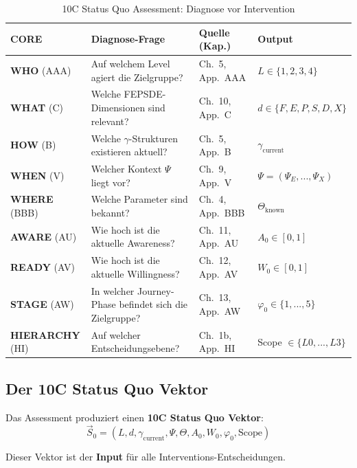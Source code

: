 \begin{table}[htbp]
\centering
\caption{10C Status Quo Assessment: Diagnose vor Intervention}
\label{tab:17-9c-status-quo}
\renewcommand{\arraystretch}{1.4}
\footnotesize
\begin{tabular}{@{}llll@{}}
\toprule
\textbf{CORE} & \textbf{Diagnose-Frage} & \textbf{Quelle (Kap.)} & \textbf{Output} \\
\midrule
\textbf{WHO} (AAA) & Auf welchem Level agiert die Zielgruppe? & Ch.\ 5, App.\ AAA & $L \in \{1,2,3,4\}$ \\
\textbf{WHAT} (C) & Welche FEPSDE-Dimensionen sind relevant? & Ch.\ 10, App.\ C & $d \in \{F,E,P,S,D,X\}$ \\
\textbf{HOW} (B) & Welche $\gamma$-Strukturen existieren aktuell? & Ch.\ 5, App.\ B & $\gamma_{\text{current}}$ \\
\textbf{WHEN} (V) & Welcher Kontext $\Psi$ liegt vor? & Ch.\ 9, App.\ V & $\Psi = (\Psi_E, ..., \Psi_X)$ \\
\textbf{WHERE} (BBB) & Welche Parameter sind bekannt? & Ch.\ 4, App.\ BBB & $\Theta_{\text{known}}$ \\
\textbf{AWARE} (AU) & Wie hoch ist die aktuelle Awareness? & Ch.\ 11, App.\ AU & $A_0 \in [0,1]$ \\
\textbf{READY} (AV) & Wie hoch ist die aktuelle Willingness? & Ch.\ 12, App.\ AV & $W_0 \in [0,1]$ \\
\textbf{STAGE} (AW) & In welcher Journey-Phase befindet sich die Zielgruppe? & Ch.\ 13, App.\ AW & $\varphi_0 \in \{1,...,5\}$ \\
\textbf{HIERARCHY} (HI) & Auf welcher Entscheidungsebene? & Ch.\ 1b, App.\ HI & Scope $\in \{L0,...,L3\}$ \\
\bottomrule
\end{tabular}
\end{table}

\subsection{Der 10C Status Quo Vektor}

Das Assessment produziert einen \textbf{10C Status Quo Vektor}:
\begin{equation}
\boxed{\vec{S}_0 = (L, d, \gamma_{\text{current}}, \Psi, \Theta, A_0, W_0, \varphi_0, \text{Scope})}
\label{eq:17-status-quo-vector}
\end{equation}

Dieser Vektor ist der \textbf{Input} für alle Interventions-Entscheidungen.

